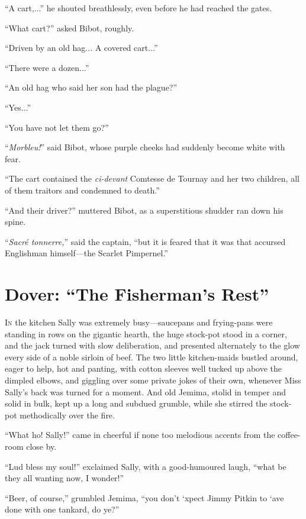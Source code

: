 \documentclass[paper=5.5in:8.5in,BCOR=7mm,twoside,DIV=calc,12pt,usegeometry,chapterprefix,endperiod,headings=big]{scrbook}
\begin{document}
\enquote{A cart,...} he shouted breathlessly, even before he had reached the gates.

\enquote{What cart?} asked Bibot, roughly.

\enquote{Driven by an old hag... A covered cart...}

\enquote{There were a dozen...}

\enquote{An old hag who said her son had the plague?}

\enquote{Yes...}

\enquote{You have not let them go?}

\enquote{\textit{Morbleu!}} said Bibot, whose purple cheeks had suddenly become white with fear.

\enquote{The cart contained the \textit{ci-devant} Comtesse de Tournay and her two children, all of them traitors and condemned to death.}

\enquote{And their driver?} muttered Bibot, as a superstitious shudder ran down his spine.

\enquote{\textit{Sacré tonnerre,}} said the captain, \enquote{but it is feared that it was that accursed Englishman himself---the Scarlet Pimpernel.}

\chapter{Dover: \enquote{The Fisherman's Rest}}
\lettrine[lines=4]{I}{n} the kitchen Sally was extremely busy---sauce\-pans and frying-pans were standing in rows on the gigantic hearth, the huge stock-pot stood in a corner, and the jack turned with slow deliberation, and presented alternately to the glow every side of a noble sirloin of beef. The two little kitchen-maids bustled around, eager to help, hot and panting, with cotton sleeves well tucked up above the dimpled elbows, and giggling over some private jokes of their own, whenever Miss Sally's back was turned for a moment. And old Jemima, stolid in temper and solid in bulk, kept up a long and subdued grumble, while she stirred the stock-pot methodically over the fire.

\enquote{What ho! Sally!} came in cheerful if none too melodious accents from the coffee-room close by.

\enquote{Lud bless my soul!} exclaimed Sally, with a good-humoured laugh, \enquote{what be they all wanting now, I wonder!}

\enquote{Beer, of course,} grumbled Jemima, \enquote{you don't `xpect Jimmy Pitkin to `ave done with one tankard, do ye?}
\end{document}
